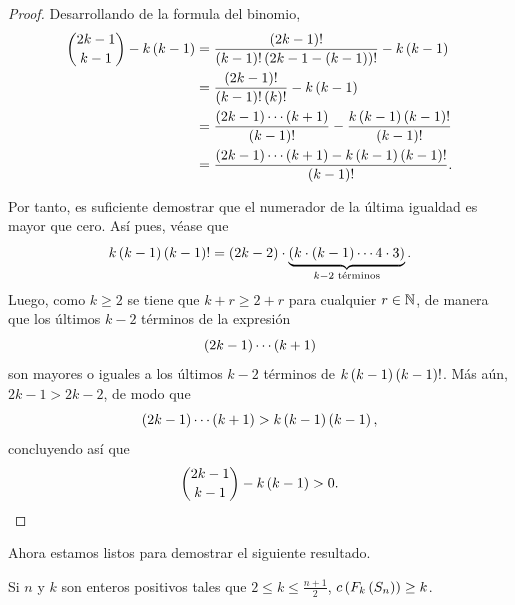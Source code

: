 \begin{proof}
    Desarrollando de la formula del binomio,
    \begin{align*}
           \binom{2k-1}{k-1} - k\left( k-1\right)
        &= \frac{\left( 2k-1\right)!}{\left( k-1\right)!\left( 2k-1-\left( k-1\right)\right)!} -
           k\left( k-1\right) \\
        &= \frac{\left( 2k-1\right)!}{\left( k-1\right)!\left( k\right)!} - k\left( k-1\right) \\
        &= \frac{\left( 2k-1\right)\cdots \left( k+1\right)}{\left( k-1\right)!} - \frac{k
           \left( k-1\right)\left( k-1\right)!}{\left( k-1\right)!} \\
        &= \frac{\left( 2k-1\right)\cdots \left( k+1\right) - k\left( k-1\right)
           \left( k-1\right)!}{\left( k-1\right)!}.
    \end{align*}

    Por tanto, es suficiente demostrar que el numerador de la \'ultima igualdad
    es mayor que cero. As\'i pues, v\'ease que
    \[
        k\left( k-1\right)\left( k-1\right)! = \left( 2k-2\right)\cdot \underbrace{\left( k \cdot
        \left( k-1\right)\cdots 4 \cdot 3\right)}_{k-2 \text{ t\'erminos}}.
    \]
    Luego, como $k\geq 2$ se tiene que $k+r \geq 2+r$ para cualquier $r\in\mathbb{N}$,
    de manera que los \'ultimos $k-2$ t\'erminos de la expresi\'on 
    \[
        \left( 2k-1\right)\cdots \left( k+1\right)
    \]
    son mayores o iguales a los \'ultimos $k-2$ t\'erminos de
    $k\left( k-1\right)\left( k-1\right)!$. M\'as a\'un, $2k-1 > 2k-2$, de modo que
    \[
        \left( 2k-1\right)\cdots \left( k+1\right) > k\left( k-1\right)\left( k-1\right),
    \]
    concluyendo as\'i que
    \[
        \binom{2k-1}{k-1} - k\left( k-1\right) > 0.
    \]
\end{proof}

Ahora estamos listos para demostrar el siguiente resultado.

\begin{teorema}
\label{teo:cota_estrella}
    Si $n$ y $k$ son enteros positivos tales que $2 \leq k \leq \frac{n+1}{2}$,
    $c\left( F_{k}\left( S_n\right)\right) \geq k$.
\end{teorema}

